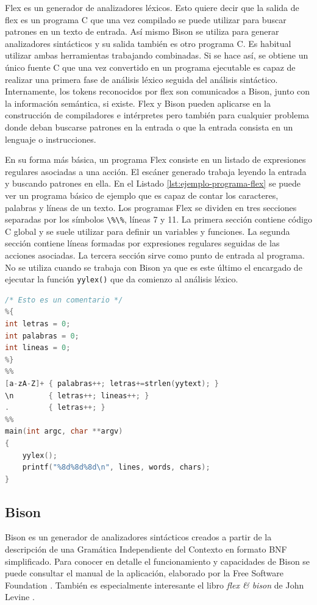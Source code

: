 Flex es un generador de analizadores léxicos. Esto quiere decir que la salida de flex es un programa C que una vez compilado se puede utilizar para buscar patrones en un texto de entrada. Así mismo Bison se utiliza para generar analizadores sintácticos y su salida también es otro programa C. Es habitual utilizar ambas herramientas trabajando combinadas. Si se hace así, se obtiene un único fuente C que una vez convertido en un programa ejecutable es capaz de realizar una primera fase de análisis léxico seguida del análisis sintáctico. Internamente, los tokens reconocidos por flex son comunicados a Bison, junto con la información semántica, si existe. Flex y Bison pueden aplicarse en la construcción de compiladores e intérpretes pero también para cualquier problema donde deban buscarse patrones en la entrada o que la entrada consista en un lenguaje o instrucciones.

En su forma más básica, un programa Flex consiste en un listado de expresiones regulares asociadas a una acción. El escáner generado trabaja leyendo la entrada y buscando patrones en ella. En el Listado \ref{lst:ejemplo-programa-flex} se puede ver un programa básico de ejemplo que es capaz de contar los caracteres, palabras y líneas de un texto. Los programas Flex se dividen en tres secciones separadas por los símbolos \verb|\%\%|, líneas 7 y 11. La primera sección contiene código C global y se suele utilizar para definir un variables y funciones. La segunda sección contiene líneas formadas por expresiones regulares seguidas de las acciones asociadas. La tercera sección sirve como punto de entrada al programa. No se utiliza cuando se trabaja con Bison ya que es este último el encargado de ejecutar la función \verb|yylex()| que da comienzo al análisis léxico.

\begin{lstlisting}[language=C,caption={Ejemplo de programa Flex autónomo},label=lst:ejemplo-programa-flex]
/* Esto es un comentario */
%{
int letras = 0;
int palabras = 0;
int lineas = 0;
%}
%%
[a-zA-Z]+ { palabras++; letras+=strlen(yytext); }
\n        { letras++; lineas++; }
.         { letras++; }
%%
main(int argc, char **argv)
{
    yylex();
    printf("%8d%8d%8d\n", lines, words, chars);
}
\end{lstlisting}

\subsection{Bison}

Bison es un generador de analizadores sintácticos creados a partir de la descripción de una Gramática Independiente del Contexto en formato BNF simplificado. Para conocer en detalle el funcionamiento y capacidades de Bison se puede consultar el manual de la aplicación, elaborado por la Free Software Foundation
\cite{fsf_web_bisonManual}. También es especialmente interesante el libro \emph{flex \& bison} de John Levine \cite{levine_book_flexBison}.

